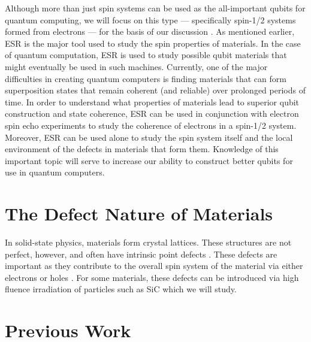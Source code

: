 \documentclass[oneside]{BYUPhys}
\begin{document}
Although more than just spin systems can be used as the all-important qubits for quantum computing, we will focus on this type --- specifically spin-1/2 systems formed from electrons --- for the basis of our discussion \cite{RefWorks:doc:58929612e4b0499fa95c50fa}. As mentioned earlier, ESR is the major tool used to study the spin properties of materials. In the case of quantum computation, ESR is used to study possible qubit materials that might eventually be used in such machines. Currently, one of the major difficulties in creating quantum computers is finding materials that can form superposition states that remain coherent (and reliable) over prolonged periods of time. In order to understand what properties of materials lead to superior qubit construction and state coherence, ESR can be used in conjunction with electron spin echo experiments to study the coherence of electrons in a spin-1/2 system. Moreover, ESR can be used alone to study the spin system itself and the local environment of the defects in materials that form them. Knowledge of this important topic will serve to increase our ability to construct better qubits for use in quantum computers.

\section{The Defect Nature of Materials}

In solid-state physics, materials form crystal lattices. These structures are not perfect, however, and often have intrinsic point defects \cite{RefWorks:doc:58929264e4b0d4c09201f63b}. These defects are important as they contribute to the overall spin system of the material via either electrons or holes \cite{RefWorks:doc:58929816e4b0499fa95c51a6}. For some materials, these defects can be introduced via high fluence irradiation of particles such as SiC which we will study.

\section{Previous Work}
\end{document}
